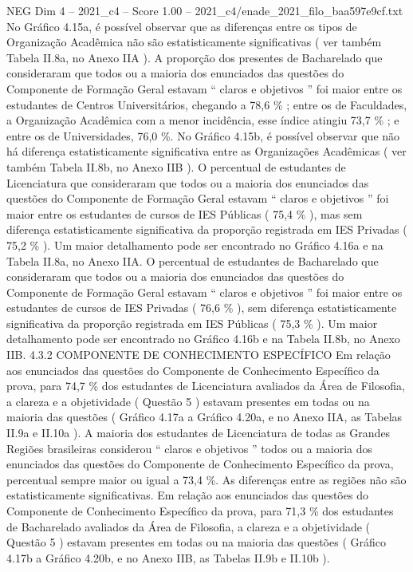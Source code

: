 \begin{textsample}{NEG Dim 4 – 2021\_c4 – Score 1.00 – 2021\_c4/enade\_2021\_filo\_baa597e9cf.txt}
No Gráfico 4.15a, é possível observar que as diferenças entre os tipos de Organização Acadêmica não são estatisticamente significativas ( ver também Tabela II.8a, no Anexo IIA ).
A proporção dos presentes de Bacharelado que consideraram que todos ou a maioria dos enunciados das questões do Componente de Formação Geral estavam “ claros e objetivos ” foi maior entre os estudantes de Centros Universitários, chegando a 78,6 \% ; entre os de Faculdades, a Organização Acadêmica com a menor incidência, esse índice atingiu 73,7 \% ; e entre os de Universidades, 76,0 \%.
No Gráfico 4.15b, é possível observar que não há diferença estatisticamente significativa entre as Organizações Acadêmicas ( ver também Tabela II.8b, no Anexo IIB ).
O percentual de estudantes de Licenciatura que consideraram que todos ou a maioria dos enunciados das questões do Componente de Formação Geral estavam “ claros e objetivos ” foi maior entre os estudantes de cursos de IES Públicas ( 75,4 \% ), mas sem diferença estatisticamente significativa da proporção registrada em IES Privadas ( 75,2 \% ).
Um maior detalhamento pode ser encontrado no Gráfico 4.16a e na Tabela II.8a, no Anexo IIA.
O percentual de estudantes de Bacharelado que consideraram que todos ou a maioria dos enunciados das questões do Componente de Formação Geral estavam “ claros e objetivos ” foi maior entre os estudantes de cursos de IES Privadas ( 76,6 \% ), sem diferença estatisticamente significativa da proporção registrada em IES Públicas ( 75,3 \% ).
Um maior detalhamento pode ser encontrado no Gráfico 4.16b e na Tabela II.8b, no Anexo IIB. 4.3.2 COMPONENTE DE CONHECIMENTO ESPECÍFICO Em relação aos enunciados das questões do Componente de Conhecimento Específico da prova, para 74,7 \% dos estudantes de Licenciatura avaliados da Área de Filosofia, a clareza e a objetividade ( Questão 5 ) estavam presentes em todas ou na maioria das questões ( Gráfico 4.17a a Gráfico 4.20a, e no Anexo IIA, as Tabelas II.9a e II.10a ).
A maioria dos estudantes de Licenciatura de todas as Grandes Regiões brasileiras considerou “ claros e objetivos ” todos ou a maioria dos enunciados das questões do Componente de Conhecimento Específico da prova, percentual sempre maior ou igual a 73,4 \%.
As diferenças entre as regiões não são estatisticamente significativas.
Em relação aos enunciados das questões do Componente de Conhecimento Específico da prova, para 71,3 \% dos estudantes de Bacharelado avaliados da Área de Filosofia, a clareza e a objetividade ( Questão 5 ) estavam presentes em todas ou na maioria das questões ( Gráfico 4.17b a Gráfico 4.20b, e no Anexo IIB, as Tabelas II.9b e II.10b ).

\end{textsample}
